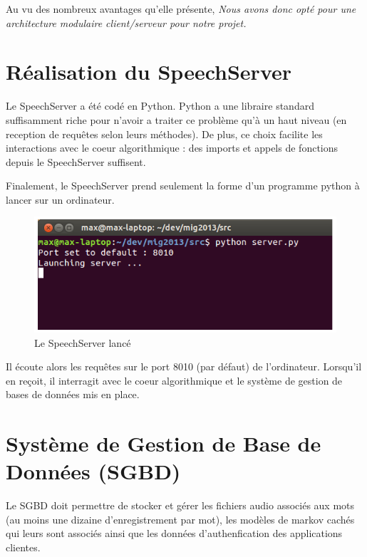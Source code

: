 \documentclass[a4paper,12pt]{report}
\begin{document}
Au vu des nombreux avantages qu'elle présente,
\emph{Nous avons donc opté pour une architecture modulaire client/serveur pour notre projet.}

\section{Réalisation du SpeechServer}

Le SpeechServer a été codé en Python. Python a une libraire standard suffisamment riche pour n'avoir a traiter ce problème qu'à un haut niveau (en reception de requêtes selon leurs méthodes). De plus, ce choix facilite les interactions avec le coeur algorithmique : des imports et appels de fonctions depuis le SpeechServer suffisent.

\medskip{}

Finalement, le SpeechServer prend seulement la forme d'un programme python à lancer sur un ordinateur.

\begin{figure}[H]
	\begin{center}
	\includegraphics[width=14cm]{pics/server.png} 
	\end{center}
	\caption{Le SpeechServer lancé}
\end{figure}

Il écoute alors les requêtes sur le port 8010 (par défaut) de l'ordinateur. Lorsqu'il en reçoit, il interragit avec le coeur algorithmique et le système de gestion de bases de données mis en place.

\section{Système de Gestion de Base de Données (SGBD)}

Le SGBD doit permettre de stocker et gérer les fichiers audio associés aux mots (au moins une dizaine d'enregistrement par mot), les modèles de markov cachés qui leurs sont associés ainsi que les données d'authenfication des applications clientes.
\end{document}
